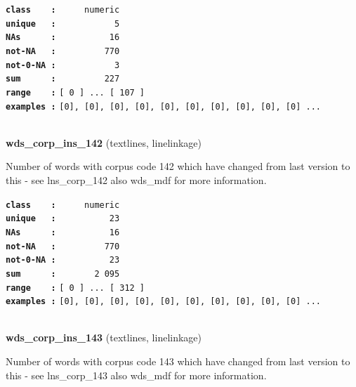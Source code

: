 \documentclass[]{article}
\begin{document}
\textbf{\texttt{class\ \ \ \ :}} \texttt{~~~~~numeric}\\
\textbf{\texttt{unique\ \ \ :}} \texttt{~~~~~~~~~~~5}\\
\textbf{\texttt{NAs\ \ \ \ \ \ :}} \texttt{~~~~~~~~~~16}\\
\textbf{\texttt{not-NA\ \ \ :}} \texttt{~~~~~~~~~770}\\
\textbf{\texttt{not-0-NA\ :}} \texttt{~~~~~~~~~~~3}\\
\textbf{\texttt{sum\ \ \ \ \ \ :}} \texttt{~~~~~~~~~227}\\
\textbf{\texttt{range\ \ \ \ :}}
\texttt{{[}\ 0\ {]}\ ...\ {[}\ 107\ {]}}\\
\textbf{\texttt{examples\ :}}
\texttt{{[}0{]},\ {[}0{]},\ {[}0{]},\ {[}0{]},\ {[}0{]},\ {[}0{]},\ {[}0{]},\ {[}0{]},\ {[}0{]},\ {[}0{]}\ ...}\\

~

\textbf{wds\_corp\_ins\_142} (textlines, linelinkage)

Number of words with corpus code 142 which have changed from last
version to this - see lns\_corp\_142 also wds\_mdf for more information.

\textbf{\texttt{class\ \ \ \ :}} \texttt{~~~~~numeric}\\
\textbf{\texttt{unique\ \ \ :}} \texttt{~~~~~~~~~~23}\\
\textbf{\texttt{NAs\ \ \ \ \ \ :}} \texttt{~~~~~~~~~~16}\\
\textbf{\texttt{not-NA\ \ \ :}} \texttt{~~~~~~~~~770}\\
\textbf{\texttt{not-0-NA\ :}} \texttt{~~~~~~~~~~23}\\
\textbf{\texttt{sum\ \ \ \ \ \ :}} \texttt{~~~~~~~2~095}\\
\textbf{\texttt{range\ \ \ \ :}}
\texttt{{[}\ 0\ {]}\ ...\ {[}\ 312\ {]}}\\
\textbf{\texttt{examples\ :}}
\texttt{{[}0{]},\ {[}0{]},\ {[}0{]},\ {[}0{]},\ {[}0{]},\ {[}0{]},\ {[}0{]},\ {[}0{]},\ {[}0{]},\ {[}0{]}\ ...}\\

~

\textbf{wds\_corp\_ins\_143} (textlines, linelinkage)

Number of words with corpus code 143 which have changed from last
version to this - see lns\_corp\_143 also wds\_mdf for more information.
\end{document}
